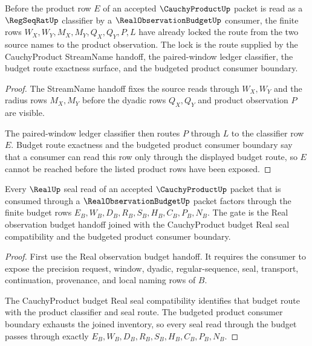 \begin{theorem}
\label{thm:cauchy-product-budget-regseq-classifier-lock}
Before the product row $E$ of an accepted $\CauchyProductUp$ packet is read as a $\RegSeqRatUp$ classifier by a $\RealObservationBudgetUp$ consumer, the finite rows $W_X,W_Y,M_X,M_Y,Q_X,Q_Y,P,L$ have already locked the route from the two source names to the product observation. The lock is the route supplied by the CauchyProduct StreamName handoff, the paired-window ledger classifier, the budget route exactness surface, and the budgeted product consumer boundary.
\end{theorem}
\begin{proof}
The StreamName handoff fixes the source reads through $W_X,W_Y$ and the radius rows $M_X,M_Y$ before the dyadic rows $Q_X,Q_Y$ and product observation $P$ are visible.

The paired-window ledger classifier then routes $P$ through $L$ to the classifier row $E$. Budget route exactness and the budgeted product consumer boundary say that a consumer can read this row only through the displayed budget route, so $E$ cannot be reached before the listed product rows have been exposed.
\end{proof}

\begin{theorem}
\label{thm:cauchy-product-real-seal-budget-gate}
Every $\RealUp$ seal read of an accepted $\CauchyProductUp$ packet that is consumed through a $\RealObservationBudgetUp$ packet factors through the finite budget rows $E_B,W_B,D_B,R_B,S_B,H_B,C_B,P_B,N_B$. The gate is the Real observation budget handoff joined with the CauchyProduct budget Real seal compatibility and the budgeted product consumer boundary.
\end{theorem}
\begin{proof}
First use the Real observation budget handoff. It requires the consumer to expose the precision request, window, dyadic, regular-sequence, seal, transport, continuation, provenance, and local naming rows of $B$.

The CauchyProduct budget Real seal compatibility identifies that budget route with the product classifier and seal route. The budgeted product consumer boundary exhausts the joined inventory, so every seal read through the budget passes through exactly $E_B,W_B,D_B,R_B,S_B,H_B,C_B,P_B,N_B$.
\end{proof}

